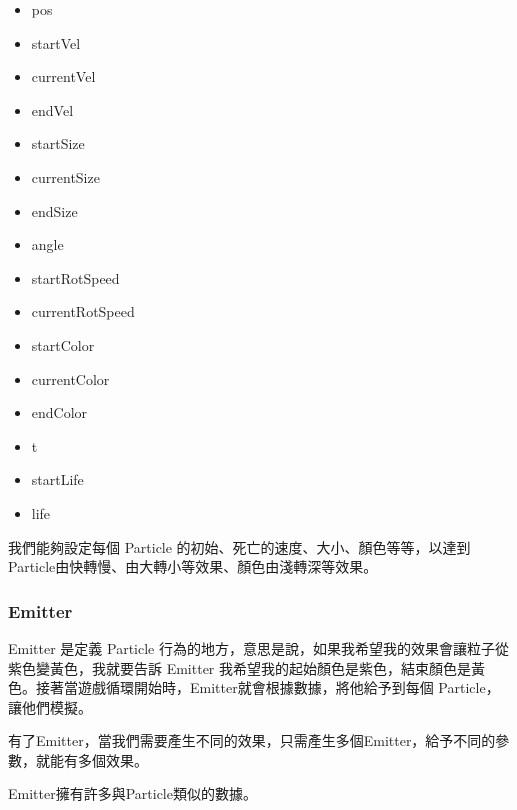 \begin{itemize}
\item{pos}
\item{startVel}
\item{currentVel}
\item{endVel}
\item{startSize}
\item{currentSize}
\item{endSize}
\item{angle}
\item{startRotSpeed}
\item{currentRotSpeed}
\item{startColor}
\item{currentColor}
\item{endColor}
\item{t}
\item{startLife}
\item{life}
\end{itemize}

我們能夠設定每個 Particle 的初始、死亡的速度、大小、顏色等等，以達到Particle由快轉慢、由大轉小等效果、顏色由淺轉深等效果。

\subsubsection{Emitter}

Emitter 是定義 Particle 行為的地方，意思是說，如果我希望我的效果會讓粒子從紫色變黃色，我就要告訴 Emitter 我希望我的起始顏色是紫色，結束顏色是黃色。接著當遊戲循環開始時，Emitter就會根據數據，將他給予到每個 Particle，讓他們模擬。

有了Emitter，當我們需要產生不同的效果，只需產生多個Emitter，給予不同的參數，就能有多個效果。

Emitter擁有許多與Particle類似的數據。

